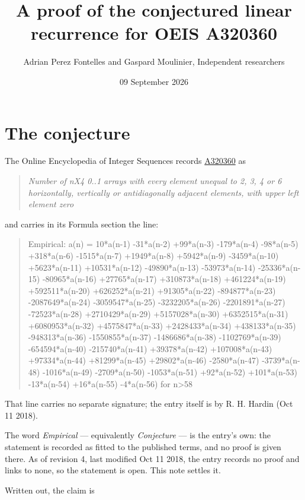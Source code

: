 \documentclass[11pt]{article}
\title{A proof of the conjectured linear recurrence for OEIS A320360}
\author{Adrian Perez Fontelles and Gaspard Moulinier, Independent researchers}
\date{09 September 2026}
\theoremstyle{definition}
\begin{document}
\maketitle
\section{The conjecture}

The Online Encyclopedia of Integer Sequences records \href{https://oeis.org/A320360}{A320360} as

\begin{quote}\itshape Number of nX4 0..1 arrays with every element unequal to 2, 3, 4 or 6 horizontally, vertically or antidiagonally adjacent elements, with upper left element zero\end{quote}

and carries in its Formula section the line:

\begin{quote}\ttfamily Empirical: a(n) = 10*a(n-1) -31*a(n-2) +99*a(n-3) -179*a(n-4) -98*a(n-5) +318*a(n-6) -1515*a(n-7) +1949*a(n-8) +5942*a(n-9) -3459*a(n-10) +5623*a(n-11) +10531*a(n-12) -49890*a(n-13) -53973*a(n-14) -25336*a(n-15) -80965*a(n-16) +27765*a(n-17) +310873*a(n-18) +461224*a(n-19) +592511*a(n-20) +626252*a(n-21) +91305*a(n-22) -894877*a(n-23) -2087649*a(n-24) -3059547*a(n-25) -3232205*a(n-26) -2201891*a(n-27) -72523*a(n-28) +2710429*a(n-29) +5157028*a(n-30) +6352515*a(n-31) +6080953*a(n-32) +4575847*a(n-33) +2428433*a(n-34) +438133*a(n-35) -948313*a(n-36) -1550855*a(n-37) -1486686*a(n-38) -1102769*a(n-39) -654594*a(n-40) -215740*a(n-41) +39378*a(n-42) +107008*a(n-43) +97334*a(n-44) +81299*a(n-45) +29802*a(n-46) -2580*a(n-47) -3739*a(n-48) -1016*a(n-49) -2709*a(n-50) -1053*a(n-51) +92*a(n-52) +101*a(n-53) -13*a(n-54) +16*a(n-55) -4*a(n-56) for n>58\end{quote}

That line carries no separate signature; the entry itself is by R. H. Hardin (Oct 11 2018).

The word {\itshape Empirical} --- equivalently {\itshape Conjecture} --- is the entry's own: the statement is recorded as fitted to the published terms, and no proof is given there. As of revision 4, last modified Oct 11 2018, the entry records no proof and links to none, so the statement is open. This note settles it.

Written out, the claim is
\end{document}
